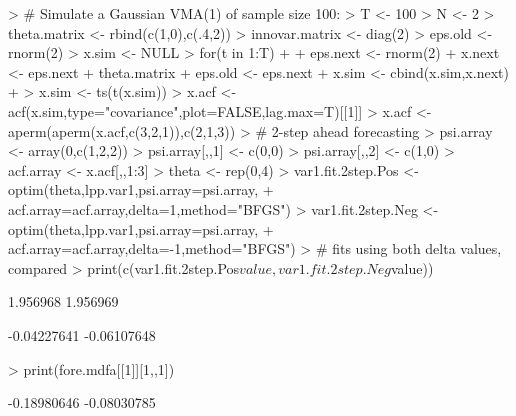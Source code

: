 \documentclass[a4paper]{book}
\begin{document}
\begin{Schunk}
\begin{Sinput}
> # Simulate a Gaussian VMA(1) of sample size 100:
> T <- 100
> N <- 2
> theta.matrix <- rbind(c(1,0),c(.4,2))
> innovar.matrix <- diag(2)
> eps.old <- rnorm(2)
> x.sim <- NULL
> for(t in 1:T)
+ {
+ 	eps.next <- rnorm(2)
+ 	x.next <- eps.next + theta.matrix %
+ 	eps.old <- eps.next
+ 	x.sim <- cbind(x.sim,x.next)
+ }
> x.sim <- ts(t(x.sim))
> x.acf <- acf(x.sim,type="covariance",plot=FALSE,lag.max=T)[[1]]
> x.acf <- aperm(aperm(x.acf,c(3,2,1)),c(2,1,3))
> # 2-step ahead forecasting
> psi.array <- array(0,c(1,2,2))
> psi.array[,,1] <- c(0,0)
> psi.array[,,2] <- c(1,0)
> acf.array <- x.acf[,,1:3]
> theta <- rep(0,4)
> var1.fit.2step.Pos <- optim(theta,lpp.var1,psi.array=psi.array,
+ 	acf.array=acf.array,delta=1,method="BFGS")
> var1.fit.2step.Neg <- optim(theta,lpp.var1,psi.array=psi.array,
+ 	acf.array=acf.array,delta=-1,method="BFGS")
> # fits using both delta values, compared
> print(c(var1.fit.2step.Pos$value,var1.fit.2step.Neg$value))		
\end{Sinput}
\begin{Soutput}
[1] 1.956968 1.956969
\end{Soutput}
\begin{Soutput}
[1] -0.04227641 -0.06107648
\end{Soutput}
\begin{Sinput}
> print(fore.mdfa[[1]][1,,1])
\end{Sinput}
\begin{Soutput}
[1] -0.18980646 -0.08030785
\end{Soutput}
\end{Schunk}
\end{document}
